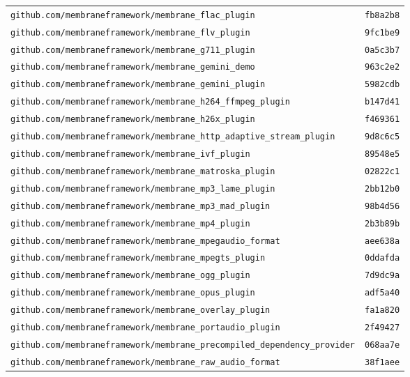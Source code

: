 \begin{longtable}{@{}p{} l@{}}
\texttt{github.com/membraneframework/membrane\_flac\_plugin} & \texttt{fb8a2b8} \\
\texttt{github.com/membraneframework/membrane\_flv\_plugin} & \texttt{9fc1be9} \\
\texttt{github.com/membraneframework/membrane\_g711\_plugin} & \texttt{0a5c3b7} \\
\texttt{github.com/membraneframework/membrane\_gemini\_demo} & \texttt{963c2e2} \\
\texttt{github.com/membraneframework/membrane\_gemini\_plugin} & \texttt{5982cdb} \\
\texttt{github.com/membraneframework/membrane\_h264\_ffmpeg\_plugin} & \texttt{b147d41} \\
\texttt{github.com/membraneframework/membrane\_h26x\_plugin} & \texttt{f469361} \\
\texttt{github.com/membraneframework/membrane\_http\_adaptive\_stream\_plugin} & \texttt{9d8c6c5} \\
\texttt{github.com/membraneframework/membrane\_ivf\_plugin} & \texttt{89548e5} \\
\texttt{github.com/membraneframework/membrane\_matroska\_plugin} & \texttt{02822c1} \\
\texttt{github.com/membraneframework/membrane\_mp3\_lame\_plugin} & \texttt{2bb12b0} \\
\texttt{github.com/membraneframework/membrane\_mp3\_mad\_plugin} & \texttt{98b4d56} \\
\texttt{github.com/membraneframework/membrane\_mp4\_plugin} & \texttt{2b3b89b} \\
\texttt{github.com/membraneframework/membrane\_mpegaudio\_format} & \texttt{aee638a} \\
\texttt{github.com/membraneframework/membrane\_mpegts\_plugin} & \texttt{0ddafda} \\
\texttt{github.com/membraneframework/membrane\_ogg\_plugin} & \texttt{7d9dc9a} \\
\texttt{github.com/membraneframework/membrane\_opus\_plugin} & \texttt{adf5a40} \\
\texttt{github.com/membraneframework/membrane\_overlay\_plugin} & \texttt{fa1a820} \\
\texttt{github.com/membraneframework/membrane\_portaudio\_plugin} & \texttt{2f49427} \\
\texttt{github.com/membraneframework/membrane\_precompiled\_dependency\_provider} & \texttt{068aa7e} \\
\texttt{github.com/membraneframework/membrane\_raw\_audio\_format} & \texttt{38f1aee} \\

\end{longtable}
